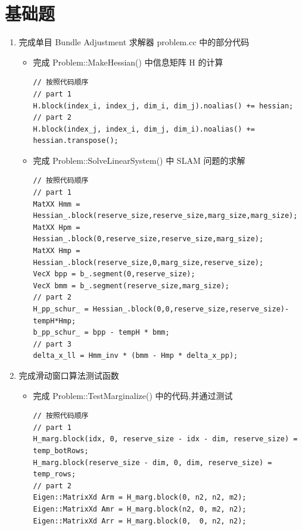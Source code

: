 \documentclass[12pt,a4paper]{article}
\begin{document}
\maketitle

\noindent
\setlength{\parindent}{2em}
\setlength{\parskip}{0.3em}
\linespread{1}

\section*{基础题} 

\begin{enumerate}

\item 完成单目 Bundle Adjustment 求解器 problem.cc 中的部分代码


\begin{itemize}

\item 完成 Problem::MakeHessian() 中信息矩阵 H 的计算

\begin{lstlisting}
// 按照代码顺序
// part 1
H.block(index_i, index_j, dim_i, dim_j).noalias() += hessian;
// part 2
H.block(index_j, index_i, dim_j, dim_i).noalias() += hessian.transpose();
\end{lstlisting}

\item 完成 Problem::SolveLinearSystem() 中 SLAM 问题的求解

\begin{lstlisting}
// 按照代码顺序
// part 1
MatXX Hmm = Hessian_.block(reserve_size,reserve_size,marg_size,marg_size);
MatXX Hpm = Hessian_.block(0,reserve_size,reserve_size,marg_size);
MatXX Hmp = Hessian_.block(reserve_size,0,marg_size,reserve_size);
VecX bpp = b_.segment(0,reserve_size);
VecX bmm = b_.segment(reserve_size,marg_size);
// part 2 
H_pp_schur_ = Hessian_.block(0,0,reserve_size,reserve_size)-tempH*Hmp;
b_pp_schur_ = bpp - tempH * bmm;
// part 3
delta_x_ll = Hmm_inv * (bmm - Hmp * delta_x_pp);
\end{lstlisting}

\end{itemize}


\item 完成滑动窗口算法测试函数

\begin{itemize}
\item 完成 Problem::TestMarginalize() 中的代码,并通过测试
\begin{lstlisting}
// 按照代码顺序
// part 1
H_marg.block(idx, 0, reserve_size - idx - dim, reserve_size) = temp_botRows;
H_marg.block(reserve_size - dim, 0, dim, reserve_size) = temp_rows;
// part 2
Eigen::MatrixXd Arm = H_marg.block(0, n2, n2, m2);
Eigen::MatrixXd Amr = H_marg.block(n2, 0, m2, n2);
Eigen::MatrixXd Arr = H_marg.block(0,  0, n2, n2);
\end{lstlisting}
\end{itemize}



\end{enumerate}
\end{document}
